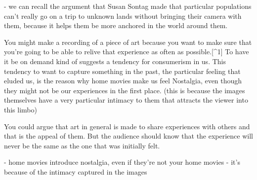 \documentclass[a4paper, 12pt]{article}
\begin{document}
- we can recall the argument that Susan Sontag made that particular populations can't really go on a trip to unknown lands without bringing their camera with them, because it helps them be more anchored in the world around them.

You might make a recording of a piece of art because you want to make sure that you're going to be able to relive that experience as often as possible.[^1] To have it be on demand kind of suggests a tendency for consumerism in us. This tendency to want to capture something in the past, the particular feeling that eluded us, is the reason why home movies make us feel Nostalgia, even though they might not be our experiences in the first place. (this is because the images themselves have a very particular intimacy to them that attracts the viewer into this limbo)

You could argue that art in general is made to share experiences with others and that is the appeal of them. But the audience should know that the experience will never be the same as the one that was initially felt.

- home movies introduce nostalgia, even if they're not your home movies
- it's because of the intimacy captured in the images
	
\end{document}
